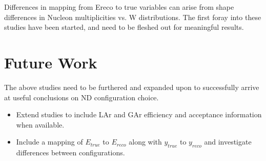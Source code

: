 \documentclass[12pt]{article}
\begin{document}
Differences in mapping from Ereco to true variables can arise from shape differences in Nucleon multiplicities vs. W distributions. The first foray into these studies have been started, and need to be fleshed out for meaningful results. 

\section{Future Work}\label{sec:Future}

The above studies need to be furthered and expanded upon to successfully arrive at useful conclusions on ND configuration choice. 

\begin{itemize}


\item Extend studies to include LAr and GAr efficiency and acceptance information when available.
\item Include a mapping of $E_{true}$ to $E_{reco}$ along with $y_{true}$ to $y_{reco}$ and investigate differences between configurations.

\end{itemize}


\end{document}
